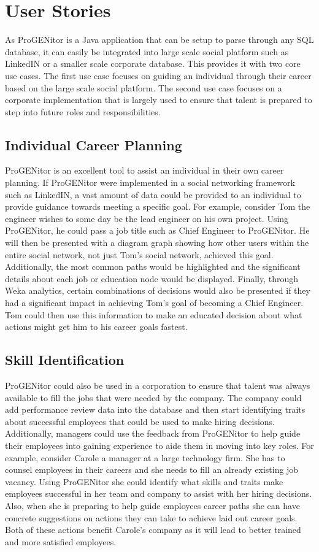 \section{User Stories}
\label{sect:user-stories}
	As ProGENitor is a Java application that can be setup to parse through any SQL
database, it can easily be integrated into large scale social platform such as
LinkedIN or a smaller scale corporate database.  This provides it with two core
use cases.  The first use case focuses on guiding an individual through their
career based on the large scale social platform.  The second use case focuses on
a corporate implementation that is largely used to ensure that talent is
prepared to step into future roles and responsibilities.
\subsection{Individual Career Planning}
		ProGENitor is an excellent tool to assist an individual in their own career
	planning.  If ProGENitor were implemented in a social networking framework such
	as LinkedIN, a vast amount of data could be provided to an individual to
	provide guidance towards meeting a specific goal.  For example, consider Tom
	the engineer wishes to some day be the lead engineer on his own project.  Using
	ProGENitor, he could pass a job title such as Chief Engineer to ProGENitor.  He
	will then be presented with a diagram graph showing how other users within
	the entire social network, not just Tom's social network, achieved this goal. 
	Additionally, the most common paths would be highlighted and the significant
	details about each job or education node would be displayed.  Finally,
	through Weka analytics, certain combinations of decisions would also be
	presented if they had a significant impact in achieving Tom's goal of
	becoming a Chief Engineer.  Tom could then use this information to make an
	educated decision about what actions might get him to his career goals fastest.
\subsection{Skill Identification}
		ProGENitor could also be used in a corporation to ensure that talent was
	always available to fill the jobs that were needed by the company.  The company
	could add performance review data into the database and then start identifying
	traits about successful employees that could be used to make hiring decisions. 
	Additionally, managers could use the feedback from ProGENitor to help guide
	their employees into gaining experience to aide them in moving into key roles. 
	For example, consider Carole a manager at a large technology firm.  She has
	to counsel employees in their careers and she needs to fill an already
	existing job vacancy.  Using ProGENitor she could identify what skills and
	traits make employees successful in her team and company to assist with her
	hiring decisions.  Also, when she is preparing to help guide employees career
	paths she can have concrete suggestions on actions they can take to achieve
	laid out career goals.  Both of these actions benefit Carole's company as it
	will lead to better trained and more satisfied employees.
